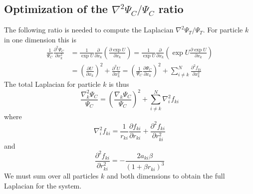 \documentclass[english, a4paper]{article}
\begin{document}
\subsection{Optimization of the $\nabla^2 \Psi_C / \Psi_C$ ratio} \label{sec:correlationLaplacian}
The following ratio is needed to compute the Laplacian $\nabla^2 \Psi_T / \Psi_T$. 
For particle $k$ in one dimension this is
\begin{align}
 \frac{1}{\Psi_C}\frac{\partial^2 \Psi_C}{\partial x_k^2} &= 
 \frac{1}{\exp{U}}\frac{\partial}{\partial x_k}\left(\frac{\partial \exp{U}}{\partial x_k}\right) = 
 \frac{1}{\exp{U}}\frac{\partial}{\partial x_k}\left(\exp{U}\frac{\partial \exp{U}}{\partial x_k}\right)\\ &= 
 \left(\frac{\partial U}{\partial x_k}\right)^2 + \frac{\partial^2 U}{\partial x_k^2} =
 \left(\frac{1}{\Psi_C}\frac{\partial \Psi_C}{\partial x_k}\right)^2 + 
 \sum_{i\neq k}^N \frac{\partial^2 f_{ki}}{\partial x_k^2}
\end{align}
The total Laplacian for particle $k$ is thus
\begin{equation}
 \frac{\nabla^2_k \Psi_C}{\Psi_C} = \left(\frac{\nabla_k \Psi_C}{\Psi_C}\right)^2 + 
 \sum_{i\neq k}^N \nabla_i^2 f_{ki}
\end{equation}
where
\begin{equation}
 \nabla_i^2 f_{ki}  = 
 \frac{1}{r_{ki}}\frac{\partial f_{ki}}{\partial r_{ki}} + \frac{\partial^2 f_{ki}}{\partial r_{ki}^2}
\end{equation}
and 
\begin{equation}
 \frac{\partial^2 f_{ki}}{\partial r_{ki}^2} = -\frac{2a_{ki}\beta}{(1 + \beta r_{ki})^3}
\end{equation}
We must sum over all particles $k$ and both dimensions to obtain the full Laplacian for the system.
\end{document}
